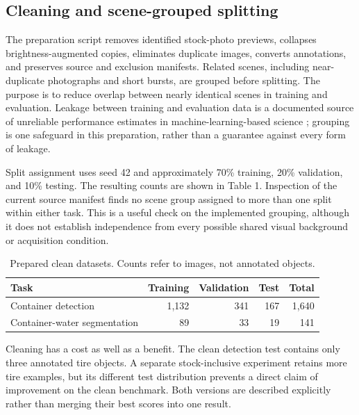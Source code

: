\documentclass[a4paper,11pt]{article}
\begin{document}
\subsection{Cleaning and scene-grouped splitting}

The preparation script removes identified stock-photo previews, collapses brightness-augmented copies, eliminates duplicate images, converts annotations, and preserves source and exclusion manifests. Related scenes, including near-duplicate photographs and short bursts, are grouped before splitting. The purpose is to reduce overlap between nearly identical scenes in training and evaluation. Leakage between training and evaluation data is a documented source of unreliable performance estimates in machine-learning-based science \cite{ref14}; grouping is one safeguard in this preparation, rather than a guarantee against every form of leakage.

Split assignment uses seed 42 and approximately 70\% training, 20\% validation, and 10\% testing. The resulting counts are shown in Table 1. Inspection of the current source manifest finds no scene group assigned to more than one split within either task. This is a useful check on the implemented grouping, although it does not establish independence from every possible shared visual background or acquisition condition.

\begin{table}[!htbp]
\centering
\caption{Prepared clean datasets. Counts refer to images, not annotated objects.}
\label{tab:1}
\fontsize{9.5}{11.5}\selectfont
\setlength{\tabcolsep}{4.3pt}
\renewcommand{\arraystretch}{1.18}
\begin{tabularx}{\linewidth}{@{}>{\raggedright\arraybackslash}Xrrrr@{}}
\toprule
\textbf{Task} & \textbf{Training} & \textbf{Validation} & \textbf{Test} & \textbf{Total} \\
\midrule
Container detection & 1,132 & 341 & 167 & 1,640 \\
Container-water segmentation & 89 & 33 & 19 & 141 \\
\bottomrule
\end{tabularx}
\end{table}

Cleaning has a cost as well as a benefit. The clean detection test contains only three annotated tire objects. A separate stock-inclusive experiment retains more tire examples, but its different test distribution prevents a direct claim of improvement on the clean benchmark. Both versions are described explicitly rather than merging their best scores into one result.
\end{document}
